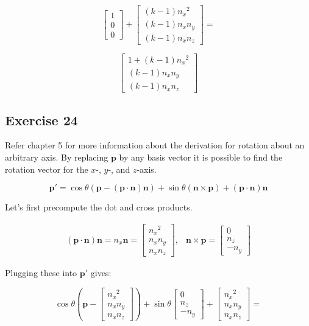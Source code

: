 \documentclass[11pt]{article}
\begin{document}
$$\begin{bmatrix}
1 \\ 0 \\ 0
\end{bmatrix}+\begin{bmatrix}
(k-1){n_x}^2 \\ (k-1)n_xn_y \\ (k-1)n_xn_z
\end{bmatrix}=
$$

$$\begin{bmatrix}
1+(k-1){n_x}^2 \\ (k-1)n_xn_y \\ (k-1)n_xn_z
\end{bmatrix}$$

\subsection{Exercise 24}

Refer chapter 5 for more information about the derivation for rotation about an arbitrary axis. By replacing $\textbf{p}$ by any basis vector it is possible to find the rotation vector for the $x$-, $y$-, and $z$-axis.

$$\textbf{p}'=\cos\theta(\textbf{p}-(\textbf{p}\cdot\textbf{n})\textbf{n})+\sin\theta(\textbf{n}\times\textbf{p})+(\textbf{p}\cdot\textbf{n})\textbf{n}$$

Let's first precompute the dot and cross products.

$$
\begin{array}{ll}
(\textbf{p}\cdot\textbf{n})\textbf{n}=n_x\textbf{n}=
\begin{bmatrix}
{n_x}^2 \\ n_xn_y \\ n_xn_z
\end{bmatrix},
&
\textbf{n}\times\textbf{p}=
\begin{bmatrix}
0 \\ n_z \\ -n_y
\end{bmatrix}
\end{array}
$$

Plugging these into $\textbf{p}'$ gives:

$$\cos\theta(\textbf{p}-
\begin{bmatrix}
{n_x}^2 \\ n_xn_y \\ n_xn_z
\end{bmatrix})+\sin\theta
\begin{bmatrix}
0 \\ n_z \\ -n_y
\end{bmatrix}+
\begin{bmatrix}
{n_x}^2 \\ n_xn_y \\ n_xn_z
\end{bmatrix}=$$
\end{document}
